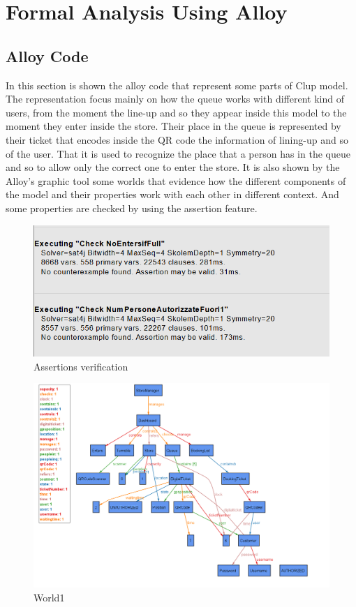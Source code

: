 \chapter{Formal Analysis Using Alloy}

\section{Alloy Code}

In this section is shown the alloy code that represent some parts of Clup model. The representation focus mainly on how the queue works with different kind of users, from the moment the line-up and so they appear inside this model to the moment they enter inside the store. Their place in the queue is represented by their ticket that encodes inside the QR code the information of lining-up and so of the user. That it is used to recognize the place that a person has in the queue and so to allow only the correct one to enter the store.
It is also shown by the Alloy’s graphic tool some worlds that evidence how the different components of the model and their properties work with each other in different context. And some properties are checked by using the assertion feature. 




\begin{figure}[H]
	\centering
	\includegraphics[width=\textwidth]{images/Assertions.png}
	\caption{Assertions verification}
	\label{figure: Assertions verification}
\end{figure}

\begin{figure}[H]
	\includegraphics[width=1.5\textwidth]{images/AlloyW1.png}
	\caption{World1}
	\label{figure: World1}
\end{figure}

